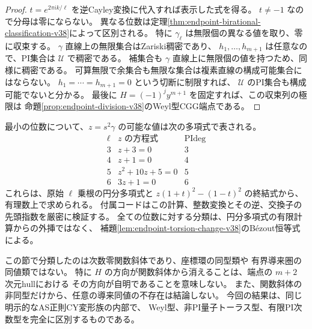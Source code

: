 \begin{proof}
$t=e^{2\pi i k/\ell}$ を逆Cayley変換に代入すれば表示した式を得る。
$t\ne-1$ なので分母は零にならない。
異なる位数は定理\ref{thm:endpoint-birational-classification-v38}によって区別される。
特に $\gamma_\ell$ は無限個の異なる値を取り、零に収束する。
$\gamma$ 直線上の無限集合はZariski稠密であり、
$h_1,\ldots,h_{m+1}$ は任意なので、PI集合は $\mathcal U$ で稠密である。
補集合も $\gamma$ 直線上に無限個の値を持つため、同様に稠密である。
可算無限で余集合も無限な集合は複素直線の構成可能集合にはならない。
$h_1=\cdots=h_{m+1}=0$ という切断に制限すれば、
$\mathcal U$ のPI集合も構成可能でないと分かる。
最後に $H=(-1)^j y^{m+1}$ を固定すれば、この収束列の極限は
命題\ref{prop:endpoint-division-v38}のWeyl型CGG端点である。
\end{proof}

最小の位数について、$z=s^2\gamma$ の可能な値は次の多項式で表される。
\[
\begin{array}{c|c|c}
 \ell&z\text{ の方程式}&\operatorname{PIdeg}\\ \hline
 3&z+3=0&3\\
 4&z+1=0&4\\
 5&z^2+10z+5=0&5\\
 6&3z+1=0&6
\end{array}
\]
これらは、原始 $\ell$ 乗根の円分多項式と
$z(1+t)^2-(1-t)^2$ の終結式から、有理数上で求められる。
付属コードはこの計算、整数変換とその逆、交換子の先頭指数を厳密に検証する。
全ての位数に対する分類は、円分多項式の有限計算からの外挿ではなく、
補題\ref{lem:endpoint-torsion-change-v38}のB\'ezout恒等式による。

\begin{remark}[圏の同型問題との区別]
この節で分類したのは次数零関数斜体であり、座標環の同型類や
有界導来圏の同値類ではない。
特に $H$ の方向が関数斜体から消えることは、端点の $m+2$ 次元hullにおける
その方向が自明であることを意味しない。
また、関数斜体の非同型だけから、任意の導来同値の不存在は結論しない。
今回の結果は、同じ明示的なAS正則CY変形族の内部で、
Weyl型、非PI量子トーラス型、有限PI次数型を完全に区別するものである。
\end{remark}
